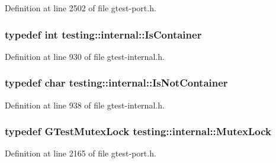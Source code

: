 Definition at line 2502 of file gtest-\/port.\+h.

\subsubsection[{\texorpdfstring{Is\+Container}{IsContainer}}]{\setlength{\rightskip}{0pt plus 5cm}typedef int {\bf testing\+::internal\+::\+Is\+Container}}\hypertarget{namespacetesting_1_1internal_ad8f0c2883245f1df2a53618a49f0deb3}{}\label{namespacetesting_1_1internal_ad8f0c2883245f1df2a53618a49f0deb3}


Definition at line 930 of file gtest-\/internal.\+h.

\subsubsection[{\texorpdfstring{Is\+Not\+Container}{IsNotContainer}}]{\setlength{\rightskip}{0pt plus 5cm}typedef char {\bf testing\+::internal\+::\+Is\+Not\+Container}}\hypertarget{namespacetesting_1_1internal_abf080521ce135deb510e0a7830fd3d33}{}\label{namespacetesting_1_1internal_abf080521ce135deb510e0a7830fd3d33}


Definition at line 938 of file gtest-\/internal.\+h.

\subsubsection[{\texorpdfstring{Mutex\+Lock}{MutexLock}}]{\setlength{\rightskip}{0pt plus 5cm}typedef {\bf G\+Test\+Mutex\+Lock} {\bf testing\+::internal\+::\+Mutex\+Lock}}\hypertarget{namespacetesting_1_1internal_a08b187c6cc4e28400aadf9a32fccc8de}{}\label{namespacetesting_1_1internal_a08b187c6cc4e28400aadf9a32fccc8de}


Definition at line 2165 of file gtest-\/port.\+h.

